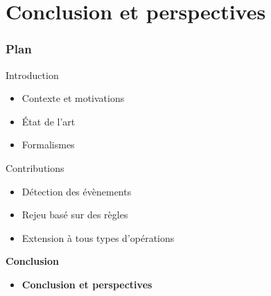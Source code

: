 \documentclass[aspectratio=1610]{beamer}
\begin{document}
\section[Conclusion]{Conclusion et perspectives}
\begin{frame}
	\frametitle{Plan}
	\centering
	\begin{minipage}{\textwidth}
    \raggedright
  \begin{minipage}{.55\textwidth}
		\begin{mytocblock}{Introduction}
			\begin{itemize}
				\item[] Contexte et motivations
				\item[] État de l'art
				\item[] Formalismes
			\end{itemize}
		\end{mytocblock}
  \end{minipage}

  \vspace{1em}

  \begin{minipage}{.55\textwidth}
    \begin{mytocblock}{Contributions}
			\begin{itemize}
				\item[] Détection des évènements
				\item[] Rejeu basé sur des règles
				\item[] Extension à tous types d'opérations
			\end{itemize}
		\end{mytocblock}
  \end{minipage}

  \vspace{1em}

  \begin{minipage}{.55\textwidth}
    \begin{mytocblock}{\textbf{Conclusion}}
			\begin{itemize}
				\item[] \textbf{Conclusion et perspectives}
			\end{itemize}
		\end{mytocblock}
  \end{minipage}
\end{minipage}
\end{frame}

\end{document}
